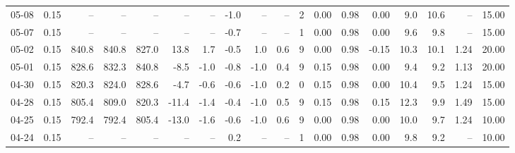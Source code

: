 \begin{threeparttable}
{\begin{tabular}{lrrrrrrrrrrrrrrrrr}
  05-08 &     0.15 &    -- &    -- &    -- &         -- &             -- &                      -1.0 &                       -- &                  -- &              2 &       0.00 &      0.98 &           0.00 &              9.0 &                10.6 &              -- &                  15.00 \\
  05-07 &     0.15 &    -- &    -- &    -- &         -- &             -- &                      -0.7 &                       -- &                  -- &              1 &       0.00 &      0.98 &           0.00 &              9.6 &                 9.8 &              -- &                  15.00 \\
  05-02 &     0.15 & 840.8 & 840.8 & 827.0 &       13.8 &            1.7 &                      -0.5 &                      1.0 &                 0.6 &              9 &       0.00 &      0.98 &          -0.15 &             10.3 &                10.1 &            1.24 &                  20.00 \\
  05-01 &     0.15 & 828.6 & 832.3 & 840.8 &       -8.5 &           -1.0 &                      -0.8 &                     -1.0 &                 0.4 &              9 &       0.15 &      0.98 &           0.00 &              9.4 &                 9.2 &            1.13 &                  20.00 \\
  04-30 &     0.15 & 820.3 & 824.0 & 828.6 &       -4.7 &           -0.6 &                      -0.6 &                     -1.0 &                 0.2 &              0 &       0.15 &      0.98 &           0.00 &             10.4 &                 9.5 &            1.24 &                  15.00 \\
  04-28 &     0.15 & 805.4 & 809.0 & 820.3 &      -11.4 &           -1.4 &                      -0.4 &                     -1.0 &                 0.5 &              9 &       0.15 &      0.98 &           0.15 &             12.3 &                 9.9 &            1.49 &                  15.00 \\
  04-25 &     0.15 & 792.4 & 792.4 & 805.4 &      -13.0 &           -1.6 &                      -0.6 &                     -1.0 &                 0.6 &              9 &       0.00 &      0.98 &           0.00 &             10.0 &                 9.7 &            1.24 &                  10.00 \\
  04-24 &     0.15 &    -- &    -- &    -- &         -- &             -- &                       0.2 &                       -- &                  -- &              1 &       0.00 &      0.98 &           0.00 &              9.8 &                 9.2 &              -- &                  10.00 \\

\end{tabular}}
\end{threeparttable}
